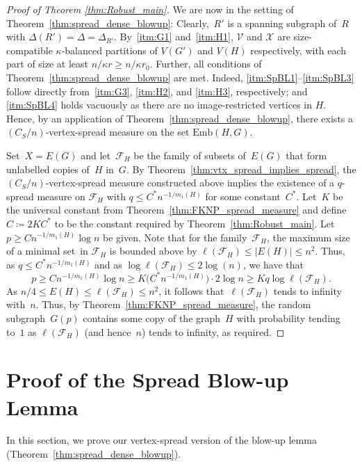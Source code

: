 \documentclass[final]{article}
\theoremstyle{definition}
\newcommand{\Emb}{\mathrm{Emb}}
\begin{document}
\begin{proof}[Proof of Theorem \ref{thm:Robust_main}]
    We are now in the setting of Theorem~\ref{thm:spread_dense_blowup}: Clearly,~$R'$ is a spanning subgraph of~$R$ with $\Delta(R') = \Delta = \Delta_{R'}$. By~\ref{itm:G1} and~\ref{itm:H1}, $\mathcal{V}$ and $\mathcal{X}$ are size-compatible $\kappa$-balanced partitions of $V(G')$ and $V(H)$ respectively, with each part of size at least $n/\kappa r \geq n/\kappa r_0$. Further, all conditions of Theorem~\ref{thm:spread_dense_blowup} are met. Indeed, \ref{itm:SpBL1}--\ref{itm:SpBL3} follow directly from~\ref{itm:G3}, \ref{itm:H2}, and \ref{itm:H3}, respectively; and \ref{itm:SpBL4} holds vacuously as there are no image-restricted vertices in $H$. Hence, by an application of Theorem~\ref{thm:spread_dense_blowup}, there exists a $(C_S/n)$-vertex-spread measure on the set $\Emb(H,G)$.

    Set~$X = E(G)$ and let~$\mathcal{F}_H$ be the family of subsets of~$E(G)$ that form unlabelled copies of~$H$ in~$G$. By Theorem~\ref{thm:vtx_spread_implies_spread}, the $(C_S/n)$-vertex-spread measure constructed above implies the existence of a $q$-spread measure on $\mathcal{F}_H$ with $q \leq C^*n^{-1/m_1(H)}$ for some constant~$C^*$. Let~$K$ be the universal constant from Theorem~\ref{thm:FKNP_spread_measure} and define $C \coloneqq 2KC^*$ to be the constant required by Theorem~\ref{thm:Robust_main}. Let $p \geq Cn^{-1/m_1(H)}\log n$ be given. Note that for the family~$\mathcal{F}_H$, the maximum size of a minimal set~in $\mathcal{F}_H$ is bounded above by $\ell(\mathcal{F}_H) \leq |E(H)| \leq n^2$. Thus, as $q \leq C^*n^{-1/m_1(H)}$ and as $\log\ell(\mathcal{F}_H) \leq 2\log(n)$, we have that $$p \geq Cn^{-1/m_1(H)}\log n \geq K \bigl(C^*n^{-1/m_1(H)}\bigr)\cdot 2\log n \geq K q \log\ell(\mathcal{F}_H).$$
    As $n/4 \leq  E(H)\leq \ell(\mathcal{F}_H) \leq n^2$, it follows that~$\ell(\mathcal{F}_H)$ tends to infinity with~$n$. Thus, by Theorem~\ref{thm:FKNP_spread_measure}, the random subgraph~$G(p)$ contains some copy of the graph~$H$ with probability tending to~$1$ as $\ell(\mathcal{F}_H)$ (and hence~$n$) tends to infinity, as required. 
\end{proof}


\section{Proof of the Spread Blow-up Lemma}
\label{sec:spreadblow}

In this section, we prove our vertex-spread version of the blow-up lemma (Theorem~\ref{thm:spread_dense_blowup}).
\end{document}
